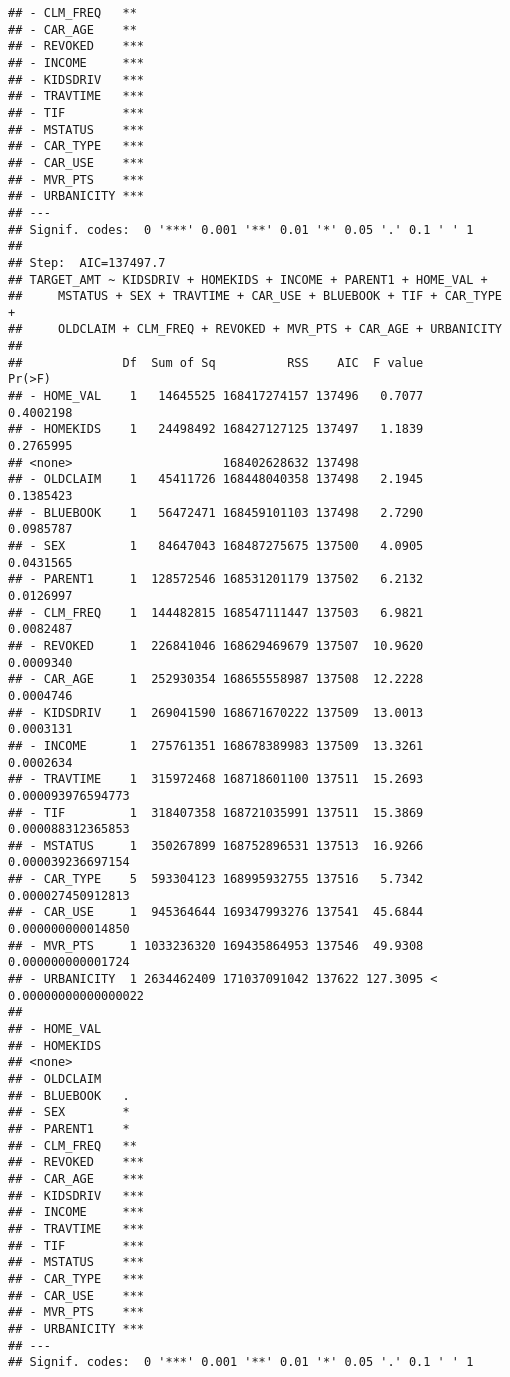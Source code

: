 \documentclass[
]{article}
\begin{document}
\begin{verbatim}
## - CLM_FREQ   ** 
## - CAR_AGE    ** 
## - REVOKED    ***
## - INCOME     ***
## - KIDSDRIV   ***
## - TRAVTIME   ***
## - TIF        ***
## - MSTATUS    ***
## - CAR_TYPE   ***
## - CAR_USE    ***
## - MVR_PTS    ***
## - URBANICITY ***
## ---
## Signif. codes:  0 '***' 0.001 '**' 0.01 '*' 0.05 '.' 0.1 ' ' 1
## 
## Step:  AIC=137497.7
## TARGET_AMT ~ KIDSDRIV + HOMEKIDS + INCOME + PARENT1 + HOME_VAL + 
##     MSTATUS + SEX + TRAVTIME + CAR_USE + BLUEBOOK + TIF + CAR_TYPE + 
##     OLDCLAIM + CLM_FREQ + REVOKED + MVR_PTS + CAR_AGE + URBANICITY
## 
##              Df  Sum of Sq          RSS    AIC  F value                Pr(>F)
## - HOME_VAL    1   14645525 168417274157 137496   0.7077             0.4002198
## - HOMEKIDS    1   24498492 168427127125 137497   1.1839             0.2765995
## <none>                     168402628632 137498                               
## - OLDCLAIM    1   45411726 168448040358 137498   2.1945             0.1385423
## - BLUEBOOK    1   56472471 168459101103 137498   2.7290             0.0985787
## - SEX         1   84647043 168487275675 137500   4.0905             0.0431565
## - PARENT1     1  128572546 168531201179 137502   6.2132             0.0126997
## - CLM_FREQ    1  144482815 168547111447 137503   6.9821             0.0082487
## - REVOKED     1  226841046 168629469679 137507  10.9620             0.0009340
## - CAR_AGE     1  252930354 168655558987 137508  12.2228             0.0004746
## - KIDSDRIV    1  269041590 168671670222 137509  13.0013             0.0003131
## - INCOME      1  275761351 168678389983 137509  13.3261             0.0002634
## - TRAVTIME    1  315972468 168718601100 137511  15.2693     0.000093976594773
## - TIF         1  318407358 168721035991 137511  15.3869     0.000088312365853
## - MSTATUS     1  350267899 168752896531 137513  16.9266     0.000039236697154
## - CAR_TYPE    5  593304123 168995932755 137516   5.7342     0.000027450912813
## - CAR_USE     1  945364644 169347993276 137541  45.6844     0.000000000014850
## - MVR_PTS     1 1033236320 169435864953 137546  49.9308     0.000000000001724
## - URBANICITY  1 2634462409 171037091042 137622 127.3095 < 0.00000000000000022
##                 
## - HOME_VAL      
## - HOMEKIDS      
## <none>          
## - OLDCLAIM      
## - BLUEBOOK   .  
## - SEX        *  
## - PARENT1    *  
## - CLM_FREQ   ** 
## - REVOKED    ***
## - CAR_AGE    ***
## - KIDSDRIV   ***
## - INCOME     ***
## - TRAVTIME   ***
## - TIF        ***
## - MSTATUS    ***
## - CAR_TYPE   ***
## - CAR_USE    ***
## - MVR_PTS    ***
## - URBANICITY ***
## ---
## Signif. codes:  0 '***' 0.001 '**' 0.01 '*' 0.05 '.' 0.1 ' ' 1

\end{verbatim}
\end{document}
